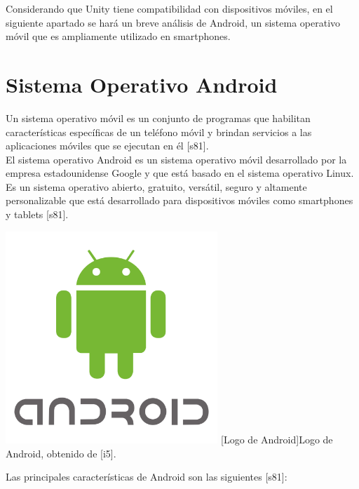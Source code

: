 Considerando que Unity tiene compatibilidad con dispositivos móviles, en el siguiente apartado se hará un breve análisis de Android, un sistema operativo móvil que es ampliamente utilizado en smartphones.\\

\section{Sistema Operativo Android}
Un sistema operativo móvil es un conjunto de programas que habilitan características específicas de un teléfono móvil y brindan servicios a las aplicaciones móviles que se ejecutan en él [s81].\\

El sistema operativo Android es un sistema operativo móvil desarrollado por la empresa estadounidense Google y que está basado en el sistema operativo Linux. Es un sistema operativo abierto, gratuito, versátil, seguro y altamente personalizable que está desarrollado para dispositivos móviles como smartphones y tablets [s81].

\begin{center}
    \includegraphics[width=0.6\textwidth]{Images/Cap 2/Android_Logo.png}
    [Logo de Android]{Logo de Android, obtenido de [i5].} 
\end{center}

Las principales características de Android son las siguientes [s81]:

